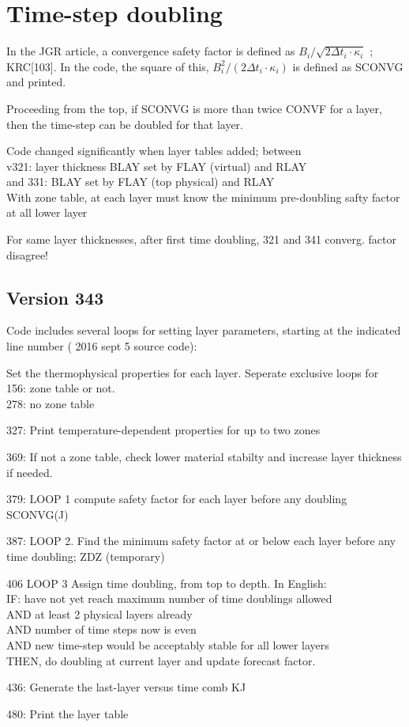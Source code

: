 \documentclass{article}
\newcommand{\qi}{\\ \hspace*{2.em}}      %
\begin{document}
\section{Time-step doubling}
In the JGR article, a convergence safety factor is defined as $ B_i / \sqrt{ 2
  \Delta t_i \cdot \kappa_i}$ ; KRC[103]. In the code, the square of this, 
 $B_i^2 / (2 \Delta t_i \cdot \kappa_i)$ is defined as SCONVG and printed.

Proceeding from the top, if SCONVG is more than twice CONVF for a layer, then
the time-step can be doubled for that layer.

Code changed significantly when layer tables added; between 
\qi v321: layer thickness BLAY set by FLAY (virtual) and RLAY 
\qi and 331: BLAY set by FLAY (top physical) and RLAY
\\ With zone table, at each layer must know the minimum pre-doubling safty factor at all lower layer

For same layer thicknesses, after first time doubling, 321 and 341
converg. factor disagree!

\subsection {Version 343}

Code includes several loops for setting layer parameters, starting at the
indicated line number ( 2016 sept 5 source code):

Set the thermophysical properties for each layer. Seperate exclusive loops for
\qi  156:  zone table or not.
\qi  278: no zone table

327: Print temperature-dependent properties for up to two zones 

369: If not a zone table, check lower material stabilty and increase layer
thickness if needed.

379: LOOP 1 compute safety factor for each layer before any doubling SCONVG(J)

387: LOOP 2. Find the minimum safety factor at or below each layer before any
time doubling; ZDZ (temporary)

406 LOOP 3 Assign time doubling, from top to depth. In English: 
\qi IF:  have not yet reach maximum number of time doublings allowed 
\qi AND at least 2 physical layers already 
\qi AND number of time steps now is even
\qi AND new time-step would be acceptably stable for all lower layers
\\ THEN, do doubling at current layer and update forecast factor.

436: Generate the last-layer versus time comb KJ

480: Print the layer table
\end{document}
